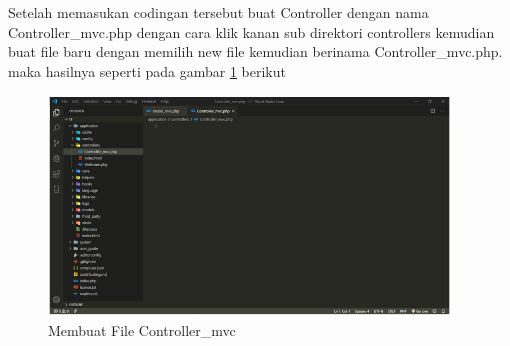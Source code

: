 Setelah memasukan codingan tersebut buat Controller dengan nama Controller\_mvc.php dengan cara klik kanan sub direktori controllers kemudian buat file baru dengan memilih new file kemudian berinama Controller\_mvc.php. maka hasilnya seperti pada gambar \ref{mvc5} berikut

\begin{figure}[h]
	\centerline{\includegraphics[width=0.95\textwidth]{figures/MVC/5.png}}
	\caption{Membuat File Controller\_mvc}
	\label{mvc5}
\end{figure}


